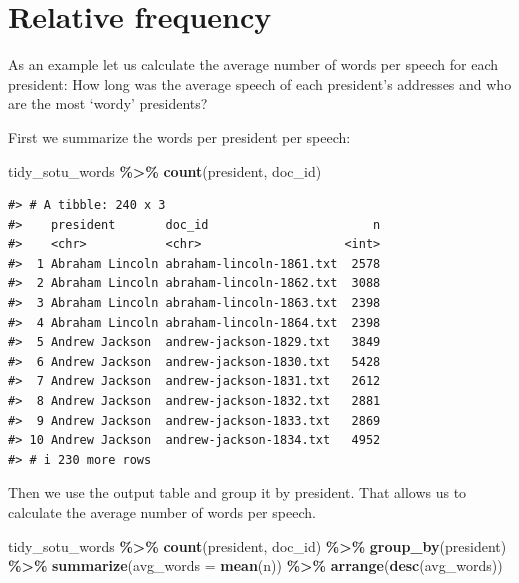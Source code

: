 \documentclass[
]{book}
\newenvironment{Shaded}{\begin{snugshade}}{\end{snugshade}}
\newcommand{\AttributeTok}[1]{\textcolor[rgb]{0.13,0.29,0.53}{#1}}
\newcommand{\FunctionTok}[1]{\textcolor[rgb]{0.13,0.29,0.53}{\textbf{#1}}}
\newcommand{\NormalTok}[1]{#1}
\newcommand{\SpecialCharTok}[1]{\textcolor[rgb]{0.81,0.36,0.00}{\textbf{#1}}}
\begin{document}
\section{Relative frequency}\label{relative-frequency}

As an example let us calculate the average number of words per speech for each president: How long was the average speech of each president's addresses and who are the most `wordy' presidents?

First we summarize the words per president per speech:

\begin{Shaded}
\begin{Highlighting}[]
\NormalTok{tidy\_sotu\_words }\SpecialCharTok{\%\textgreater{}\%}
  \FunctionTok{count}\NormalTok{(president, doc\_id)}
\end{Highlighting}
\end{Shaded}

\begin{verbatim}
#> # A tibble: 240 x 3
#>    president       doc_id                       n
#>    <chr>           <chr>                    <int>
#>  1 Abraham Lincoln abraham-lincoln-1861.txt  2578
#>  2 Abraham Lincoln abraham-lincoln-1862.txt  3088
#>  3 Abraham Lincoln abraham-lincoln-1863.txt  2398
#>  4 Abraham Lincoln abraham-lincoln-1864.txt  2398
#>  5 Andrew Jackson  andrew-jackson-1829.txt   3849
#>  6 Andrew Jackson  andrew-jackson-1830.txt   5428
#>  7 Andrew Jackson  andrew-jackson-1831.txt   2612
#>  8 Andrew Jackson  andrew-jackson-1832.txt   2881
#>  9 Andrew Jackson  andrew-jackson-1833.txt   2869
#> 10 Andrew Jackson  andrew-jackson-1834.txt   4952
#> # i 230 more rows
\end{verbatim}

Then we use the output table and group it by president. That allows us to calculate the average number of words per speech.

\begin{Shaded}
\begin{Highlighting}[]
\NormalTok{tidy\_sotu\_words }\SpecialCharTok{\%\textgreater{}\%}
  \FunctionTok{count}\NormalTok{(president, doc\_id)  }\SpecialCharTok{\%\textgreater{}\%} 
  \FunctionTok{group\_by}\NormalTok{(president) }\SpecialCharTok{\%\textgreater{}\%} 
  \FunctionTok{summarize}\NormalTok{(}\AttributeTok{avg\_words =} \FunctionTok{mean}\NormalTok{(n)) }\SpecialCharTok{\%\textgreater{}\%} 
  \FunctionTok{arrange}\NormalTok{(}\FunctionTok{desc}\NormalTok{(avg\_words))}
\end{Highlighting}
\end{Shaded}
\end{document}
